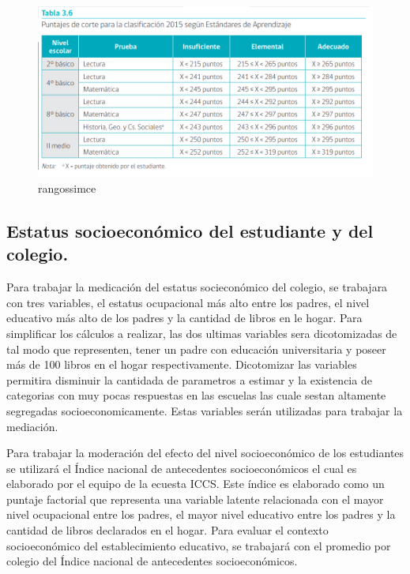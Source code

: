 \documentclass[12pt,twoside]{templates/facsothesis}
\begin{document}
\begin{figure}[!ht]

{\centering \includegraphics[width=0.8\linewidth,]{images/Rangos-puntaje-simce} 

}

\caption{rangossimce}\label{fig:unnamed-chunk-6}
\end{figure}

\hypertarget{estatus-socioeconuxf3mico-del-estudiante-y-del-colegio.}{%
\subsection{Estatus socioeconómico del estudiante y del colegio.}\label{estatus-socioeconuxf3mico-del-estudiante-y-del-colegio.}}

Para trabajar la medicación del estatus socieconómico del colegio, se trabajara con tres variables, el estatus ocupacional más alto entre los padres, el nivel educativo más alto de los padres y la cantidad de libros en le hogar. Para simplificar los cálculos a realizar, las dos ultimas variables sera dicotomizadas de tal modo que representen, tener un padre con educación universitaria y poseer más de 100 libros en el hogar respectivamente. Dicotomizar las variables permitira disminuir la cantidada de parametros a estimar y la existencia de categorias con muy pocas respuestas en las escuelas las cuale sestan altamente segregadas socioeconomicamente. Estas variables serán utilizadas para trabajar la mediación.

Para trabajar la moderación del efecto del nivel socioeconómico de los estudiantes se utilizará el Índice nacional de antecedentes socioeconómicos el cual es elaborado por el equipo de la ecuesta ICCS. Este índice es elaborado como un puntaje factorial que representa una variable latente relacionada con el mayor nivel ocupacional entre los padres, el mayor nivel educativo entre los padres y la cantidad de libros declarados en el hogar. Para evaluar el contexto socioeconómico del establecimiento educativo, se trabajará con el promedio por colegio del Índice nacional de antecedentes socioeconómicos.
\end{document}
